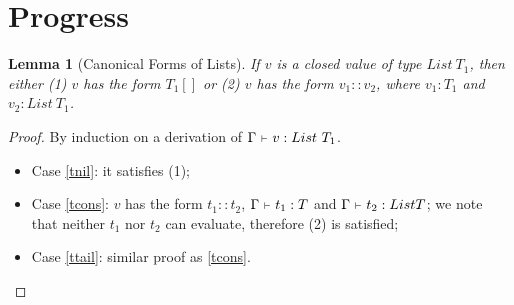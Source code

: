 \documentclass{report}
\newtheorem{lemma}{Lemma}
\newtheorem{proof}{Proof}
\newcommand{\type}{:}
\newcommand{\ctx}{~\mathsmaller\vdash~}
\newcommand{\ctxtype}[2]{\Gamma\ctx #1 \type #2}
\begin{document}
\section{Progress}

\begin{lemma}[Canonical Forms of Lists]
  If $v$ is a closed value of type $List~T_1$, then either (1) $v$ has the form $T_1[]$ or (2) $v$ has the form $v_1 :: v_2$, where $v_1\type T_1$ and $v_2\type List~T_1$.
  \label{cflist}
\end{lemma}
\begin{proof}
  By induction on a derivation of $\ctxtype{v}{List~T_1}$.
  \begin{itemize}
    \item Case \ref{tnil}: it satisfies (1);
    \item Case \ref{tcons}: $v$ has the form $t_1 :: t_2$, $\ctxtype{t_1}{T}$ and $\ctxtype{t_2}{List T}$; we note that neither $t_1$ nor $t_2$ can evaluate, therefore (2) is satisfied;
    \item Case \ref{ttail}: similar proof as \ref{tcons}.
  \end{itemize}
\end{proof}
\end{document}
